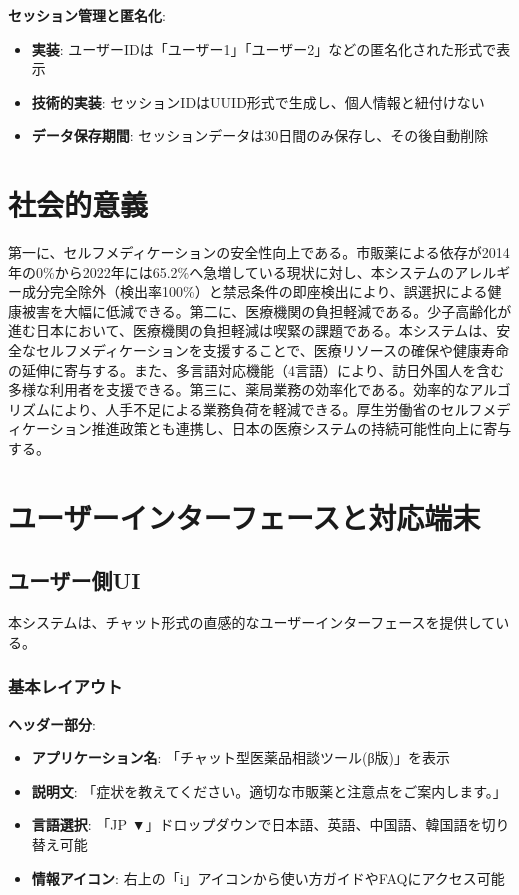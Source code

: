 \documentclass[a4paper,11pt,ja=standard,xelatex]{bxjsarticle}
\theoremstyle{definition}
\begin{document}
\textbf{セッション管理と匿名化}:
\begin{itemize}
\item \textbf{実装}: ユーザーIDは「ユーザー1」「ユーザー2」などの匿名化された形式で表示
\item \textbf{技術的実装}: セッションIDはUUID形式で生成し、個人情報と紐付けない
\item \textbf{データ保存期間}: セッションデータは30日間のみ保存し、その後自動削除
\end{itemize}

\section{社会的意義}

第一に、セルフメディケーションの安全性向上である。市販薬による依存が2014年の0\%から2022年には65.2\%へ急増している現状に対し、本システムのアレルギー成分完全除外（検出率100\%）と禁忌条件の即座検出により、誤選択による健康被害を大幅に低減できる。第二に、医療機関の負担軽減である。少子高齢化が進む日本において、医療機関の負担軽減は喫緊の課題である。本システムは、安全なセルフメディケーションを支援することで、医療リソースの確保や健康寿命の延伸に寄与する。また、多言語対応機能（4言語）により、訪日外国人を含む多様な利用者を支援できる。第三に、薬局業務の効率化である。効率的なアルゴリズムにより、人手不足による業務負荷を軽減できる。厚生労働省のセルフメディケーション推進政策とも連携し、日本の医療システムの持続可能性向上に寄与する。

\section{ユーザーインターフェースと対応端末}

\subsection{ユーザー側UI}

本システムは、チャット形式の直感的なユーザーインターフェースを提供している。

\subsubsection{基本レイアウト}

\textbf{ヘッダー部分}:
\begin{itemize}
\item \textbf{アプリケーション名}: 「チャット型医薬品相談ツール(β版)」を表示
\item \textbf{説明文}: 「症状を教えてください。適切な市販薬と注意点をご案内します。」
\item \textbf{言語選択}: 「JP ▼」ドロップダウンで日本語、英語、中国語、韓国語を切り替え可能
\item \textbf{情報アイコン}: 右上の「i」アイコンから使い方ガイドやFAQにアクセス可能
\end{itemize}
\end{document}
